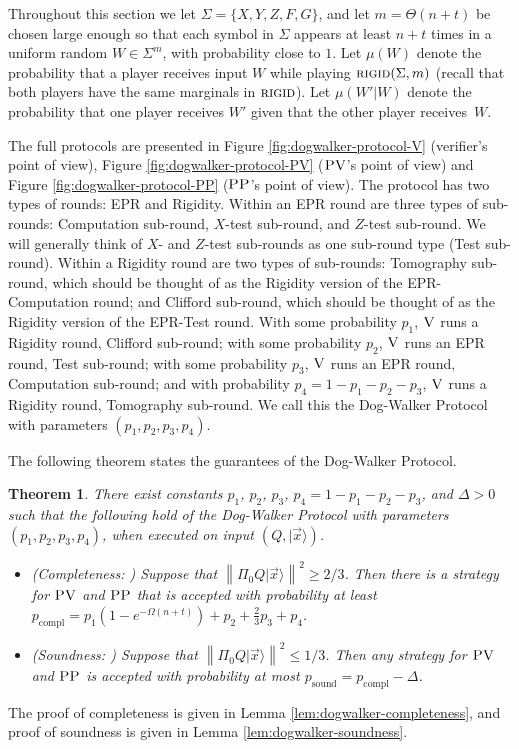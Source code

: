 \documentclass[11pt]{article}
\newtheorem{theorem}{Theorem}
\theoremstyle{remark}
\theoremstyle{definition}
\newcommand{\ket}[1]{|#1\rangle}
\newcommand{\norm}[1]{\left\|#1\right\|}
\newcommand{\rigid}{\textsc{rigid}}
\newcommand{\ver}{\textsc{V}}
\newcommand{\pv}{\textsc{PV}}
\newcommand{\pp}{\textsc{PP}}
\begin{document}
Throughout this section we 
let $\Sigma=\{X,Y,Z,F,G\}$, and let $m=\Theta(n+t)$ be chosen 
large enough so that each symbol in $\Sigma$ appears at least $n+t$ times in a uniform random $W\in\Sigma^m$, with probability close to $1$.
Let $\mu({W})$ denote the probability that a player receives input ${W}$ while playing $\rigid(\Sigma,m)$ (recall that both players have the same marginals in $\rigid$). Let $\mu({W}'|{W})$ denote the probability that one player receives ${W}'$ given that the other player receives~${W}$. 

The full protocols are presented in Figure \ref{fig:dogwalker-protocol-V} (verifier's point of view), Figure \ref{fig:dogwalker-protocol-PV} ($\pv$'s point of view) and Figure \ref{fig:dogwalker-protocol-PP} ($\pp$'s point of view). The protocol has two 
types of rounds: 
EPR and Rigidity. Within an EPR round are three 
types of sub-rounds: 
Computation sub-round, $X$-test sub-round, and $Z$-test sub-round. We will generally think of $X$- and $Z$-test sub-rounds as one sub-round type (Test sub-round). Within a Rigidity round are two types of sub-rounds: Tomography sub-round, which should be thought of as the Rigidity version of the EPR-Computation round; and Clifford sub-round, which should be thought of as the Rigidity version of the EPR-Test round. With some probability $p_1$, $\ver$ runs a Rigidity round, Clifford sub-round; with some probability $p_2$, $\ver$ runs an EPR round, Test sub-round; with some probability $p_3$, $\ver$ runs an EPR round, Computation sub-round; and with probability $p_4=1-p_1-p_2-p_3$, $\ver$ runs a Rigidity round, Tomography sub-round. We call this the Dog-Walker Protocol with parameters $(p_1,p_2,p_3,p_4)$.


The following theorem states the guarantees of the Dog-Walker Protocol.

\begin{theorem}\label{thm:dog-walker}
There exist constants $p_1$, $p_2$, $p_3$, $p_4=1-p_1-p_2-p_3$, and $\Delta>0$ such that the following hold of the Dog-Walker Protocol with parameters $(p_1,p_2,p_3,p_4)$, when executed on input $(Q,\ket{\vec{x}})$.
\begin{itemize}
\item (Completeness: ) Suppose that $\norm{\Pi_0Q\ket{\vec{x}}}^2\geq 2/3$. Then
  there is a strategy for $\pv$ and $\pp$ that is accepted with probability at
    least $p_{\mathrm{compl}}=p_1(1-e^{-\Omega(n+t)})+p_2+\frac{2}{3}p_3 +
    p_4$. 
\item (Soundness: ) Suppose that $\norm{\Pi_0Q\ket{\vec{x}}}^2\leq 1/3$. Then any strategy for $\pv$ and $\pp$ is accepted with probability at most $p_{\mathrm{sound}}=p_{\mathrm{compl}}-\Delta$. 
\end{itemize}
\end{theorem}
\noindent The proof of completeness is given in Lemma \ref{lem:dogwalker-completeness}, and proof of soundness is given in Lemma \ref{lem:dogwalker-soundness}. 
\end{document}
